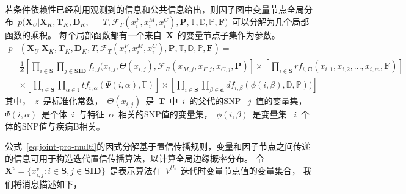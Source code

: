 若条件依赖性已经利用观测到的信息和公共信息给出，则因子图中变量节点全局分布~$p(\mathbf{X}_U | \mathbf{X}_K, \mathbf{T}_K,\mathbf{D}_K,~$~ ~$T, \mathcal{F}_T(x_i^F, x_i^M, x_i^C), \mathbf{P}, \mathbb{T}, \mathbb{D}, \mathbb{P}, \mathbf{F})$~可以分解为几个局部函数的乘积。 每个局部函数都有一个来自~$\mathbf{X}$~的变量节点子集作为参数。
\begin{equation}\label{eq:joint-pro-multi}
\begin{aligned}
p&(\mathbf{X}_U | \mathbf{X}_K, \mathbf{T}_K, \mathbf{D}_K, T, \mathcal{F}_T(x_i^F,x_i^M,x_i^C), \mathbf{P}, \mathbb{T}, \mathbb{D}, \mathbb{P}, \mathbf{F}) =   \\
& \frac{1}{Z}[\prod_{i \in \mathbf{S}} \prod_{j \in \mathbf{SID}} f_{i,j}(x_{i,j}, \Theta(x_{i,j}),\mathcal{F}_{R}(x_{M,j},x_{F,j}, x_{C,j},\mathbf{P})] \times [\prod_{i \in \mathbf{S}}rf_{i,\mathbf{C}}(x_{i,1},x_{i,2},...,x_{i,m},\mathbf{F})]  \\
&  \times [\prod_{i \in \mathbf{S}}\prod_{\alpha \in \mathbf{t}}tf_{i,\alpha}(\Psi(i,\alpha),\mathbb{T})] \times [\prod_{i \in \mathbf{S}}\prod_{\beta \in \mathbf{d}}df_{i,\beta}(\phi(i,\beta),\mathbb{D},\mathbb{P}))]
\end{aligned}
\end{equation}
其中，~$z$~是标准化常数，~$\Theta(x_{i,j})$~是~$\mathbf{T}$~中~$i$~的父代的SNP ~$j$~值的变量集，~$\Psi(i,\alpha)$~是个体~$i$~与特征~$\alpha$~相关的SNP值的变量集，~$\phi(i,\beta)$~是变量集 ~$i$~个体的SNP值与疾病B相关。

公式~\ref{eq:joint-pro-multi}的因式分解基于置信传播规则，变量和因子节点之间传递的信息可用于构造迭代置信传播算法，以计算全局边缘概率分布。 令~$\mathbf{X}^v=\{x_{i,j}^v: i\in \mathbf{S}, j \in \mathbf{SID}\}$~是表示算法在~$V^{th}$~迭代时变量节点值的变量集合， 我们将消息描述如下，

